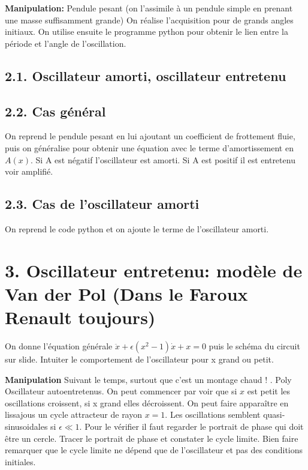 \documentclass[french, a4paper, 10pt, twocolumn, landscape]{article}
\begin{document}
\textbf{Manipulation:} Pendule pesant (on l'assimile à un pendule simple en prenant une masse suffisamment grande) On réalise l'acquisition pour de grands angles initiaux. On utilise ensuite le programme python pour obtenir le lien entre la période et l'angle de l'oscillation.

\subsection*{2.1. Oscillateur amorti, oscillateur entretenu}

\subsection*{2.2. Cas général}

On reprend le pendule pesant en lui ajoutant un coefficient de frottement fluie, puis on généralise pour obtenir une équation avec le terme d'amortissement en $A(x)$. Si A est négatif l'oscillateur est amorti. Si A est positif il est entretenu voir amplifié.

\subsection*{2.3. Cas de l'oscillateur amorti}

On reprend le code python et on ajoute le terme de l'oscillateur amorti.

\section*{3. Oscillateur entretenu: modèle de Van der Pol (Dans le Faroux Renault toujours)}

On donne l'équation générale $\ddot{x}+\epsilon(x^2-1)\dot{x}+x=0$ puis le schéma du circuit sur slide. Intuiter le comportement de l'oscillateur pour x grand ou petit.

\textbf{Manipulation} Suivant le temps, surtout que c'est un montage chaud ! . Poly Oscillateur autoentretenus. On peut commencer par voir que si $x$ est petit les oscillations croissent, si x grand elles décroissent. On peut faire apparaître en lissajous un cycle attracteur de rayon $x=1$. Les oscillations semblent quasi-sinusoidales si $\epsilon\ll 1$. Pour le vérifier il faut regarder le portrait de phase qui doit être un cercle. Tracer le portrait de phase  et constater le cycle limite. Bien faire remarquer que le cycle limite ne dépend que de l'oscillateur et pas des conditions initiales.
\end{document}

